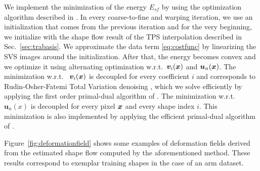 We implement the minimization of the energy $E_{sf}$ by using the optimization algorithm described in \cite{Garg:2013hu}. In every coarse-to-fine and warping iteration, we use an initialization that comes from the previous iteration and for the very beginning, we initialize with the shape flow result of the TPS interpolation described in Sec.~\ref{sec:trabasis}. We approximate the data term \eqref{eq:costfunc} by linearizing the SVS images around the initialization. After that, the energy becomes convex and we optimize it using alternating optimization w.r.t.~$\bm{v}_i(\boldsymbol{x})$ and $\bm{u}_n(\boldsymbol{x})$. The minimization w.r.t.~
$\bm{v}_i(\boldsymbol{x})$ is decoupled for every coefficient $i$ and corresponds to Rudin-Osher-Fatemi Total Variation denoising \cite{rudin92}, which we solve efficiently by applying the first order primal-dual algorithm of \cite{Chambolle:Pock:JMIV2011}. The minimization w.r.t.~
$\bm{u}_n(x)$ is decoupled for every pixel $\boldsymbol{x}$ and every shape index $i$. This minimization is also implemented by applying the efficient primal-dual algorithm of \cite{Chambolle:Pock:JMIV2011}.



Figure~\ref{fig:deformationfield} shows some examples of deformation fields derived from the estimated shape flow computed by the aforementioned method. These results correspond to exemplar training shapes in the case of an arm dataset.


